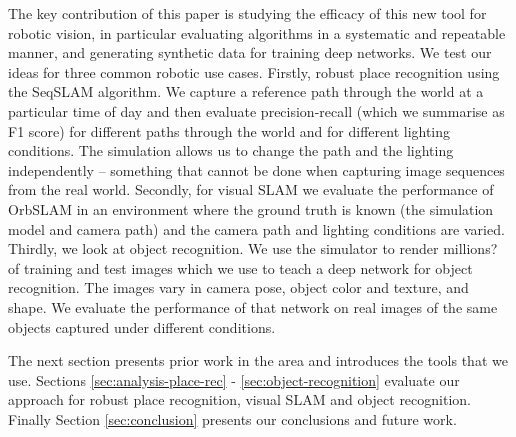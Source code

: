 The key contribution of this paper is studying the efficacy of this new tool for robotic vision, in particular evaluating algorithms in a systematic and repeatable manner, and generating synthetic data for training deep networks.
We test our ideas for three common robotic use cases.
Firstly, robust place recognition using the SeqSLAM\cite{Milford2012} algorithm.  We capture a reference path through the world at a particular time of day and then evaluate precision-recall (which we summarise as F1 score) for different paths through the world and for different lighting conditions.  The simulation allows us to change the path and the lighting independently -- something that cannot be done when capturing image sequences from the real world.
Secondly, for visual SLAM we evaluate the performance of OrbSLAM in an environment where the ground truth is known (the simulation model and camera path) and the camera path and lighting conditions are varied.
Thirdly, we look at object recognition.  We use the simulator to render millions? of training and test images which we use to teach a deep network for object recognition.  The images vary in camera pose, object color and texture, and shape.  We evaluate the performance of that network on real images of the same objects captured under different conditions. 

The next section presents prior work in the area and introduces the tools that we use.  Sections \ref{sec:analysis-place-rec} - \ref{sec:object-recognition} evaluate our approach for robust place recognition,
visual SLAM and object recognition.  Finally Section \ref{sec:conclusion} presents our conclusions and future work. 

